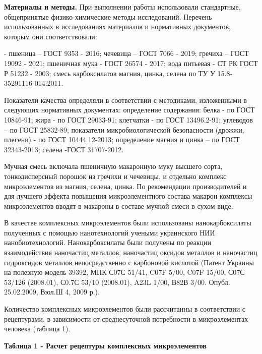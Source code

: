 {\bfseries Материалы и методы.} При выполнении работы использовали
стандартные, общепринятые физико-химические методы исследований.
Перечень использованных в исследованиях материалов и нормативных
документов, которым они соответствовали:

- пшеница -- ГОСТ 9353 - 2016; чечевица -- ГОСТ 7066 - 2019; гречиха --
ГОСТ 19092 - 2021; пшеничная мука - ГОСТ 26574 - 2017; вода питьевая -
СТ РК ГОСТ Р 51232 - 2003; смесь карбоксилатов магния, цинка, селена по
ТУ У 15.8-35291116-014:2011.

Показатели качества определяли в соответствии с методиками, изложенными
в следующих нормативных документах: определение содержания: белка - по
ГОСТ 10846-91; жира - по ГОСТ 29033-91; клетчатки - по ГОСТ 13496.2-91;
углеводов -- по ГОСТ 25832-89; показатели микробиологической
безопасности (дрожжи, плесени) - по ГОСТ 10444.12-2013; определение
магния и цинка -- по ГОСТ 32343-2013; селена -ГОСТ 31707-2012.

Мучная смесь включала пшеничную макаронную муку высшего сорта,
тонкодисперсный порошок из гречихи и чечевицы, и отдельно комплекс
микроэлементов из магния, селена, цинка. По рекомендации производителей
и для лучшего эффекта повышения микроэлементного состава макарон
комплексы микроэлементов вводят в макароны в составе мучной смеси в
сухом виде.

В качестве комплексных микроэлементов были использованы нанокарбоксилаты
полученных с помощью нанотехнологий учеными украинского НИИ
нанобиотехнологий. Нанокарбоксилаты были получены по реакции
взаимодействия наночастиц металлов, наночастиц оксидов металлов и
наночастиц гидроксидов металлов непосредственно с карбоновой кислотой
(Патент Украины на полезную модель 39392, МПК С07С 51/41, C07F 5/00,
C07F 15/00, С07С 53/126 (2008.01), С0.7С 53/10 (2008.01), A23L 1/00,
В82В 3/00. Опубл. 25.02.2009, Вюл.Ш 4, 2009 р.).

Количество комплексных микроэлементов были рассчитанны в соответствии с
рецептурами, в зависимости от среднесуточной потребности в
микроэлементах человека (таблица 1).

{\bfseries Таблица 1 - Расчет рецептуры комплексных микроэлементов}


